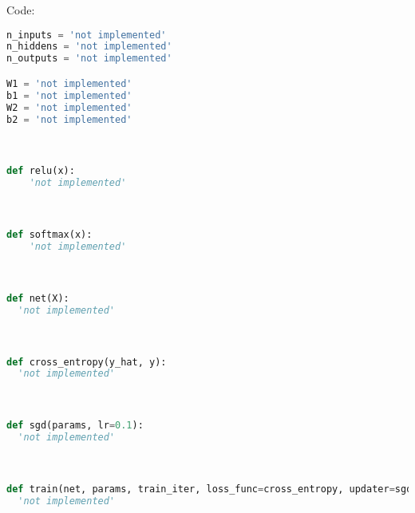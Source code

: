 \documentclass[submit]{harvardml}
\begin{document}

Code:

\begin{lstlisting}[language=Python]
n_inputs = 'not implemented'
n_hiddens = 'not implemented'
n_outputs = 'not implemented'

W1 = 'not implemented'
b1 = 'not implemented'
W2 = 'not implemented'
b2 = 'not implemented'



def relu(x):
    'not implemented'



def softmax(x):
    'not implemented'



def net(X):
  'not implemented'



def cross_entropy(y_hat, y):
  'not implemented'



def sgd(params, lr=0.1):
  'not implemented'



def train(net, params, train_iter, loss_func=cross_entropy, updater=sgd):
  'not implemented'

\end{lstlisting}

\newpage

\end{document}
